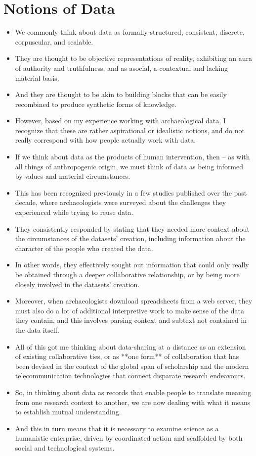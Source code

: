\documentclass{article}
\begin{document}
\section{Notions of Data}
\begin{itemize}
  \item We commonly think about data as formally-structured, consistent, discrete, corpuscular, and scalable.
  \item They are thought to be objective representations of reality, exhibiting an aura of authority and truthfulness, and as asocial, a-contextual and lacking material basis.
  \item And they are thought to be akin to building blocks that can be easily recombined to produce synthetic forms of knowledge.
  \item However, based on my experience working with archaeological data, I recognize that these are rather aspirational or idealistic notions, and do not really correspond with how people actually work with data.
  \item If we think about data as the products of human intervention, then -- as with all things of anthropogenic origin, we must think of data as being informed by values and material circumstances.
  \item This has been recognized previously in a few studies published over the past decade, where archaeologists were surveyed about the challenges they experienced while trying to reuse data.
  \item They consistently responded by stating that they needed more context about the circumstances of the datasets' creation, including information about the character of the people who created the data.
  \item In other words, they effectively sought out information that could only really be obtained through a deeper collaborative relationship, or by being more closely involved in the datasets' creation.
  \item Moreover, when archaeologists download spreadsheets from a web server, they must also do a lot of additional interpretive work to make sense of the data they contain, and this involves parsing context and subtext not contained in the data itself.
  \item All of this got me thinking about data-sharing at a distance as an extension of existing collaborative ties, or as **one form** of collaboration that has been devised in the context of the global span of scholarship and the modern telecommunication technologies that connect disparate research endeavours.
  \item So, in thinking about data as records that enable people to translate meaning from one research context to another, we are now dealing with what it means to establish mutual understanding.
  \item And this in turn means that it is necessary to examine science as a humanistic enterprise, driven by coordinated action and scaffolded by both social and technological systems.
\end{itemize}
\end{document}
